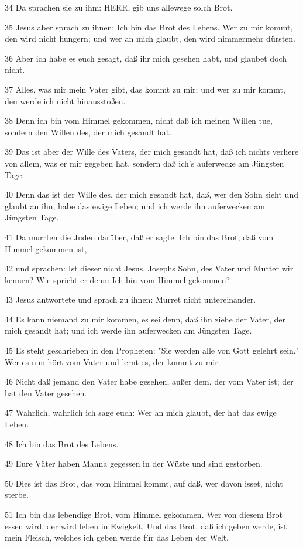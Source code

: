 \par 34 Da sprachen sie zu ihm: HERR, gib uns allewege solch Brot.
\par 35 Jesus aber sprach zu ihnen: Ich bin das Brot des Lebens. Wer zu mir kommt, den wird nicht hungern; und wer an mich glaubt, den wird nimmermehr dürsten.
\par 36 Aber ich habe es euch gesagt, daß ihr mich gesehen habt, und glaubet doch nicht.
\par 37 Alles, was mir mein Vater gibt, das kommt zu mir; und wer zu mir kommt, den werde ich nicht hinausstoßen.
\par 38 Denn ich bin vom Himmel gekommen, nicht daß ich meinen Willen tue, sondern den Willen des, der mich gesandt hat.
\par 39 Das ist aber der Wille des Vaters, der mich gesandt hat, daß ich nichts verliere von allem, was er mir gegeben hat, sondern daß ich's auferwecke am Jüngsten Tage.
\par 40 Denn das ist der Wille des, der mich gesandt hat, daß, wer den Sohn sieht und glaubt an ihn, habe das ewige Leben; und ich werde ihn auferwecken am Jüngsten Tage.
\par 41 Da murrten die Juden darüber, daß er sagte: Ich bin das Brot, daß vom Himmel gekommen ist,
\par 42 und sprachen: Ist dieser nicht Jesus, Josephs Sohn, des Vater und Mutter wir kennen? Wie spricht er denn: Ich bin vom Himmel gekommen?
\par 43 Jesus antwortete und sprach zu ihnen: Murret nicht untereinander.
\par 44 Es kann niemand zu mir kommen, es sei denn, daß ihn ziehe der Vater, der mich gesandt hat; und ich werde ihn auferwecken am Jüngsten Tage.
\par 45 Es steht geschrieben in den Propheten: "Sie werden alle von Gott gelehrt sein." Wer es nun hört vom Vater und lernt es, der kommt zu mir.
\par 46 Nicht daß jemand den Vater habe gesehen, außer dem, der vom Vater ist; der hat den Vater gesehen.
\par 47 Wahrlich, wahrlich ich sage euch: Wer an mich glaubt, der hat das ewige Leben.
\par 48 Ich bin das Brot des Lebens.
\par 49 Eure Väter haben Manna gegessen in der Wüste und sind gestorben.
\par 50 Dies ist das Brot, das vom Himmel kommt, auf daß, wer davon isset, nicht sterbe.
\par 51 Ich bin das lebendige Brot, vom Himmel gekommen. Wer von diesem Brot essen wird, der wird leben in Ewigkeit. Und das Brot, daß ich geben werde, ist mein Fleisch, welches ich geben werde für das Leben der Welt.
